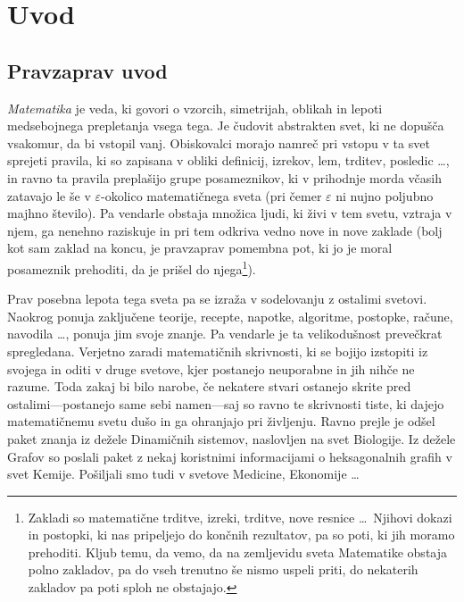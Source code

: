 \chapter{Uvod}

\section{Pravzaprav uvod}
\emph{Matematika} je veda, ki govori o vzorcih, simetrijah, oblikah in lepoti medsebojnega prepletanja vsega tega. Je čudovit abstrakten svet, ki ne dopušča vsakomur, da bi vstopil vanj. Obiskovalci morajo namreč pri vstopu v ta svet sprejeti pravila, ki so zapisana v obliki definicij, izrekov, lem, trditev, posledic \ldots, in ravno ta pravila preplašijo grupe posameznikov, ki v prihodnje morda včasih zatavajo le še v $\varepsilon$-okolico matematičnega sveta (pri čemer $\varepsilon$ ni nujno poljubno majhno število). Pa vendarle obstaja množica ljudi, ki živi v tem svetu, vztraja v njem, ga nenehno raziskuje in pri tem odkriva vedno nove in nove zaklade (bolj kot sam zaklad na koncu, je pravzaprav pomembna pot, ki jo je moral posameznik prehoditi, da je prišel do njega\footnote{Zakladi so matematične trditve, izreki, trditve, nove resnice \ldots\ Njihovi dokazi in postopki, ki nas pripeljejo do končnih rezultatov, pa so poti, ki jih moramo prehoditi. Kljub temu, da vemo, da na zemljevidu sveta Matematike obstaja polno zakladov, pa do vseh trenutno še nismo uspeli priti, do nekaterih zakladov pa poti sploh ne obstajajo.}).

Prav posebna lepota tega sveta pa se izraža v sodelovanju z ostalimi svetovi. Naokrog ponuja zaključene teorije, recepte, napotke, algoritme, postopke, račune, navodila \ldots, ponuja jim svoje znanje. Pa vendarle je ta velikodušnost prevečkrat spregledana. Verjetno zaradi matematičnih skrivnosti, ki se bojijo izstopiti iz svojega in oditi v druge svetove, kjer postanejo neuporabne in jih nihče ne razume. Toda zakaj bi bilo narobe, če nekatere stvari ostanejo skrite pred ostalimi---postanejo same sebi namen---saj so ravno te skrivnosti tiste, ki dajejo matematičnemu svetu dušo in ga ohranjajo pri življenju. Ravno prejle je odšel paket znanja iz dežele Dinamičnih sistemov, naslovljen na svet Biologije. Iz dežele Grafov so poslali paket z nekaj koristnimi informacijami o heksagonalnih grafih v svet Kemije. Pošiljali smo tudi v svetove Medicine, Ekonomije \ldots

